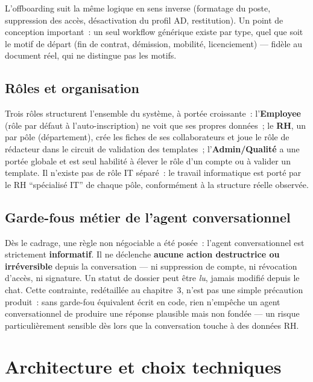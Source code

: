 \documentclass[12pt,a4paper]{article}
\begin{document}
L'offboarding suit la m\^eme logique en sens inverse (formatage du poste, suppression des acc\`es, d\'esactivation du profil AD, restitution). Un point de conception important~: un seul workflow g\'en\'erique existe par type, quel que soit le motif de d\'epart (fin de contrat, d\'emission, mobilit\'e, licenciement) --- fid\`ele au document r\'eel, qui ne distingue pas les motifs.

\subsection{R\^oles et organisation}

Trois r\^oles structurent l'ensemble du syst\`eme, \`a port\'ee croissante~: l'\textbf{Employee} (r\^ole par d\'efaut \`a l'auto-inscription) ne voit que ses propres donn\'ees~; le \textbf{RH}, un par p\^ole (d\'epartement), cr\'ee les fiches de ses collaborateurs et joue le r\^ole de r\'edacteur dans le circuit de validation des templates~; l'\textbf{Admin/Qualit\'e} a une port\'ee globale et est seul habilit\'e \`a \'elever le r\^ole d'un compte ou \`a valider un template. Il n'existe pas de r\^ole IT s\'epar\'e~: le travail informatique est port\'e par le RH ``sp\'ecialis\'e IT'' de chaque p\^ole, conform\'ement \`a la structure r\'eelle observ\'ee.

\subsection{Garde-fous m\'etier de l'agent conversationnel}

D\`es le cadrage, une r\`egle non n\'egociable a \'et\'e pos\'ee~: l'agent conversationnel est strictement \textbf{informatif}. Il ne d\'eclenche \textbf{aucune action destructrice ou irr\'eversible} depuis la conversation --- ni suppression de compte, ni r\'evocation d'acc\`es, ni signature. Un statut de dossier peut \^etre \textit{lu}, jamais modifi\'e depuis le chat. Cette contrainte, red\'etaill\'ee au chapitre~3, n'est pas une simple pr\'ecaution produit~: sans garde-fou \'equivalent \'ecrit en code, rien n'emp\^eche un agent conversationnel de produire une r\'eponse plausible mais non fond\'ee --- un risque particuli\`erement sensible d\`es lors que la conversation touche \`a des donn\'ees RH.

\newpage
\section{Architecture et choix techniques}
\end{document}
